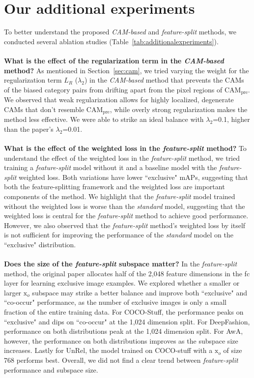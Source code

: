 \section{Our additional experiments}

To better understand the proposed \emph{CAM-based} and \emph{feature-split} methods, we conducted several ablation studies (Table~\ref{tab:additionalexperiments}).\\
\\
\textbf{What is the effect of the regularization term in the \emph{CAM-based} method?} As mentioned in Section~\ref{sec:cam}, we tried varying the weight for the regularization term $L_R$ ($\lambda_2$) in the \emph{CAM-based} method that prevents the CAMs of the biased category pairs from drifting apart from the pixel regions of CAM$_{\text{pre}}$. We observed that weak regularization allows for highly localized, degenerate CAMs that don't resemble CAM$_{\text{pre}}$, while overly strong regularization makes the method less effective. We were able to strike an ideal balance with $\lambda_2$=0.1, higher than the paper's $\lambda_2$=0.01.\\
\\
\textbf{What is the effect of the weighted loss in the \emph{feature-split} method?} To understand the effect of the weighted loss in the \emph{feature-split} method, we tried training a \emph{feature-split} model without it and a baseline model with the \emph{feature-split} weighted loss. Both variations have lower ``exclusive" mAPs, suggesting that both the feature-splitting framework and the weighted loss are important components of the method. We highlight that the \emph{feature-split} model trained without the weighted loss is worse than the \emph{standard} model, suggesting that the weighted loss is central for the \emph{feature-split} method to achieve good performance. However, we also observed that the \emph{feature-split} method's weighted loss by itself is not sufficient for improving the performance of the \emph{standard} model on the ``exclusive" distribution.\\
\\
\textbf{Does the size of the \textit{feature-split} subspace matter?} In the \textit{feature-split} method, the original paper allocates half of the 2,048 feature dimensions in the fc layer for learning exclusive image examples. We explored whether a smaller or larger $\mathrm{x}_o$ subspace may strike a better balance and improve both ``exclusive" and ``co-occur" performance, as the number of exclusive images is only a small fraction of the entire training data. For COCO-Stuff, the performance peaks on ``exclusive" and dips on ``co-occur" at the 1,024 dimension split. For DeepFashion, performance on both distributions peak at the 1,024 dimension split. For AwA, however, the performance on both distributions improves as the subspace size increases. Lastly for UnRel, the model trained on COCO-stuff with a $\mathrm{x}_o$ of size 768 performs best. Overall, we did not find a clear trend between \emph{feature-split} performance and subspace size. 


